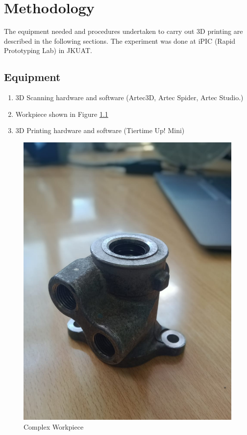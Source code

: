 \chapter{Methodology}
\lhead{\leftmark}
The equipment needed and procedures undertaken to carry out 3D printing  are described in the following sections. The experiment was done at iPIC (Rapid Prototyping Lab) in JKUAT.
\section{Equipment}
\begin{enumerate}
\item 3D Scanning hardware and software (Artec3D, Artec Spider, Artec Studio.)
\item Workpiece shown in Figure \ref{fig:3dscan}
\item 3D Printing hardware and software (Tiertime Up! Mini)
\end{enumerate}
\begin{center}
	\begin{figure}[h!]
	\centering
	\includegraphics[width=0.4\linewidth]{Figures/Figure}
	\caption{Complex Workpiece}
	\label{fig:3dscan}
	\end{figure}
\end{center}
\newpage
